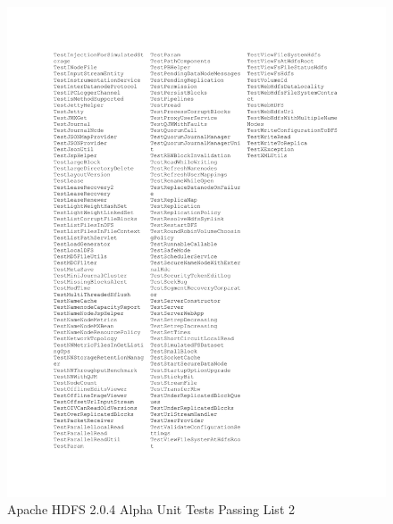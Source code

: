 \begin{figure}[ht]
	\centering
	\includegraphics[width=\linewidth]{figs/unitTest2.pdf}
	\caption{Apache HDFS 2.0.4 Alpha Unit Tests Passing List 2}
	\label{fig:unit2}
\end{figure}

